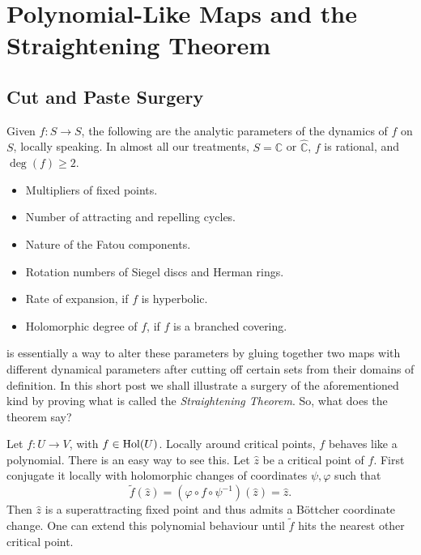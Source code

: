 \documentclass[11pt,a4paper]{article}
\begin{document}
\section*{Polynomial-Like Maps and the Straightening Theorem}
\subsection{Cut and Paste Surgery}
Given $f\colon S\to S$, the following are the analytic parameters of the
dynamics of $f$ on $S$, locally speaking. In almost all our treatments,
$S=\mathbb C$ or $\widehat{\mathbb C}$, $f$ is rational, and $\deg(f)\ge2$.
\begin{itemize}
 \item Multipliers of fixed points.
 \item Number of attracting and repelling cycles.
 \item Nature of the Fatou components.
 \item Rotation numbers of Siegel discs and Herman rings.
 \item Rate of expansion, if $f$ is hyperbolic.
 \item Holomorphic degree of $f$, if $f$ is a branched covering.
\end{itemize}
 is essentially a way to alter these parameters
by gluing together two maps with different dynamical parameters after
cutting off certain sets from their domains of definition. In this short
post we shall illustrate a surgery of the aforementioned kind by
proving what is called the \emph{Straightening Theorem}.
So, what does the theorem say?

Let $f\colon U\to V$, with $f\in\operatorname{Hol}(U)$. Locally around critical points,
$f$ behaves like a polynomial. There is an easy way to see this. Let
$\widehat z$ be a critical point of $f$. First conjugate it locally with
holomorphic changes of coordinates $\psi,\varphi$ such that
\[
 \widetilde f(\widehat z)
 =(\varphi\circ f\circ\psi^{-1})(\widehat z)=\widehat z.
\]
Then $\widehat z$ is a superattracting fixed point and thus admits a
B\"ottcher coordinate change. One can extend this polynomial behaviour
until $\widetilde f$ hits the nearest other critical point.
\end{document}
